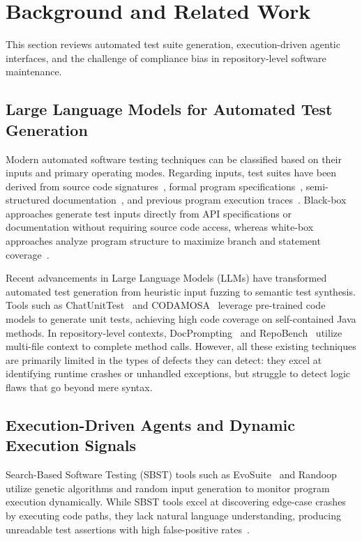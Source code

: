 \section{Background and Related Work}
\label{sec:related}

This section reviews automated test suite generation, execution-driven agentic interfaces, and the challenge of compliance bias in repository-level software maintenance.

\subsection{Large Language Models for Automated Test Generation}
Modern automated software testing techniques can be classified based on their inputs and primary operating modes. Regarding inputs, test suites have been derived from source code signatures~\cite{bareiss2022code, schafer2023empirical}, formal program specifications~\cite{docprompting}, semi-structured documentation~\cite{testexplora}, and previous program execution traces~\cite{swebench}. Black-box approaches generate test inputs directly from API specifications or documentation without requiring source code access, whereas white-box approaches analyze program structure to maximize branch and statement coverage~\cite{evosuite, randoop}.

Recent advancements in Large Language Models (LLMs) have transformed automated test generation from heuristic input fuzzing to semantic test synthesis. Tools such as ChatUnitTest~\cite{xie2023chatunitest} and CODAMOSA~\cite{lemieux2023codamosa} leverage pre-trained code models to generate unit tests, achieving high code coverage on self-contained Java methods. In repository-level contexts, DocPrompting~\cite{docprompting} and RepoBench~\cite{repobench} utilize multi-file context to complete method calls. However, all these existing techniques are primarily limited in the types of defects they can detect: they excel at identifying runtime crashes or unhandled exceptions, but struggle to detect logic flaws that go beyond mere syntax.

\subsection{Execution-Driven Agents and Dynamic Execution Signals}
Search-Based Software Testing (SBST) tools such as EvoSuite~\cite{evosuite} and Randoop~\cite{randoop} utilize genetic algorithms and random input generation to monitor program execution dynamically. While SBST tools excel at discovering edge-case crashes by executing code paths, they lack natural language understanding, producing unreadable test assertions with high false-positive rates~\cite{siddiq2023exploratory}.

